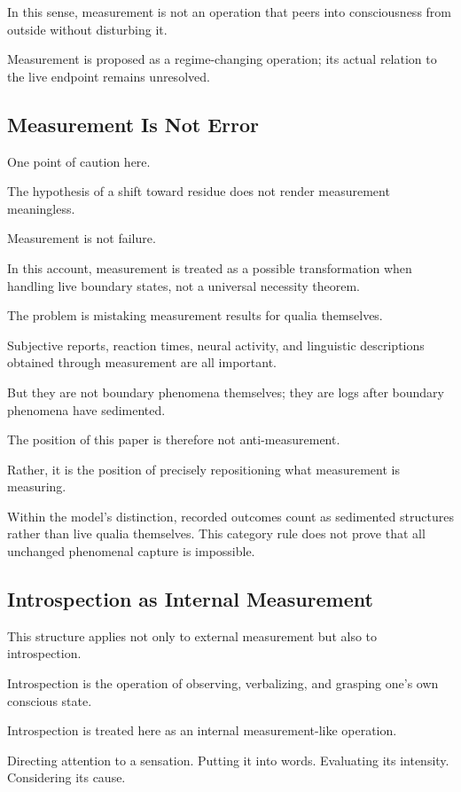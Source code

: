 In this sense, measurement is not an operation that peers into consciousness from outside without disturbing it.

Measurement is proposed as a regime-changing operation; its actual relation to the live endpoint remains unresolved.

\subsection{Measurement Is Not Error}


One point of caution here.

The hypothesis of a shift toward residue does not render measurement meaningless.

Measurement is not failure.

In this account, measurement is treated as a possible transformation when handling live boundary states, not a universal necessity theorem.

The problem is mistaking measurement results for qualia themselves.

Subjective reports, reaction times, neural activity, and linguistic descriptions obtained through measurement are all important.

But they are not boundary phenomena themselves; they are logs after boundary phenomena have sedimented.

The position of this paper is therefore not anti-measurement.

Rather, it is the position of precisely repositioning what measurement is measuring.

Within the model's distinction, recorded outcomes count as sedimented structures rather than live qualia themselves. This category rule does not prove that all unchanged phenomenal capture is impossible.

\subsection{Introspection as Internal Measurement}


This structure applies not only to external measurement but also to introspection.

Introspection is the operation of observing, verbalizing, and grasping one's own conscious state.

Introspection is treated here as an internal measurement-like operation.

Directing attention to a sensation. Putting it into words. Evaluating its intensity. Considering its cause.

